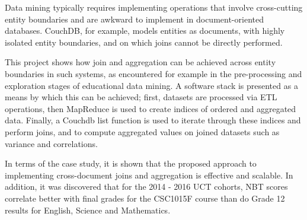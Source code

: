 Data mining typically requires implementing operations that involve cross-cutting entity boundaries and are awkward to implement in document-oriented databases. CouchDB, for example, models entities as documents, with highly isolated entity boundaries, and on which joins cannot be directly performed.

This project shows how join and aggregation can be achieved across entity boundaries in such systems, as encountered for example in the pre-processing and exploration stages of educational data mining. A software stack is presented as a means by which this can be achieved; first, datasets are processed via ETL operations, then MapReduce is used to create indices of ordered and aggregated data. Finally, a Couchdb list function is used to iterate through these indices and perform joins, and to compute aggregated values on joined datasets such as variance and correlations.

In terms of the case study, it is shown that the proposed approach to implementing cross-document joins and aggregation is effective and scalable. In addition, it was discovered that for the 2014 - 2016 UCT cohorts, NBT scores correlate better with final grades for the CSC1015F course than do Grade 12 results for English, Science and Mathematics.